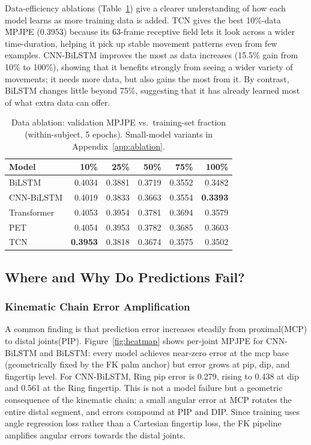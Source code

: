 \documentclass[11pt]{article}
\begin{document}
Data-efficiency ablations (Table~\ref{tab:ablation}) give a clearer understanding of how each model learns as more training data is added. TCN gives the best 10\%-data MPJPE (0.3953) because its 63-frame receptive field lets it look across a wider time-duration, helping it pick up stable movement patterns even from few examples. CNN-BiLSTM improves the most as data increases (15.5\% gain from 10\% to 100\%), showing that it benefits strongly from seeing a wider variety of movements; it needs more data, but also gains the most from it. By contrast, BiLSTM changes little beyond 75\%, suggesting that it has already learned most of what extra data can offer.

\begin{table}[H]
\centering
\caption{Data ablation: validation MPJPE vs.\ training-set fraction (within-subject, 5 epochs). Small-model variants in Appendix~\ref{app:ablation}.}
\label{tab:ablation}
\begin{tabular}{lrrrrr}
\hline
\textbf{Model} & \textbf{10\%} & \textbf{25\%} & \textbf{50\%} & \textbf{75\%} & \textbf{100\%} \\
\hline
BiLSTM          & 0.4034 & 0.3881 & 0.3719 & 0.3552 & 0.3482 \\
CNN-BiLSTM      & 0.4019 & 0.3833 & 0.3663 & 0.3554 & \textbf{0.3393} \\
Transformer     & 0.4053 & 0.3954 & 0.3781 & 0.3694 & 0.3579 \\
PET             & 0.4054 & 0.3953 & 0.3782 & 0.3685 & 0.3603 \\
TCN             & \textbf{0.3953} & 0.3818 & 0.3674 & 0.3575 & 0.3502 \\
\hline
\end{tabular}
\end{table}

\subsection{Where and Why Do Predictions Fail?}
\label{sec:results_errors}

\subsubsection{Kinematic Chain Error Amplification}
\label{sec:kinematic_error}

A common finding is that prediction error increases steadily from proximal(MCP) to distal joints(PIP). Figure~\ref{fig:heatmap} shows per-joint MPJPE for CNN-BiLSTM and BiLSTM: every model achieves near-zero error at the \gls{mcp} base (geometrically fixed by the FK palm anchor) but error grows at \gls{pip}, \gls{dip}, and fingertip level. For CNN-BiLSTM, Ring \gls{pip} error is 0.279, rising to 0.438 at \gls{dip} and 0.561 at the Ring fingertip. This is not a model failure but a geometric consequence of the kinematic chain: a small angular error at MCP rotates the entire distal segment, and errors compound at PIP and DIP. Since training uses angle regression loss rather than a Cartesian fingertip loss, the FK pipeline amplifies angular errors towards the distal joints.
\end{document}
